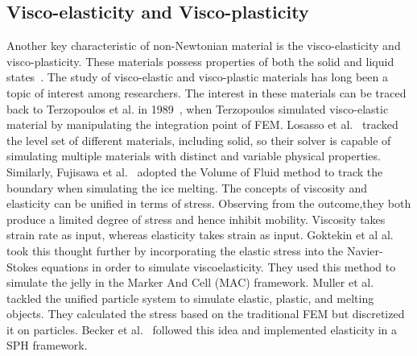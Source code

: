 \documentclass[10pt,journal,compsoc]{IEEEtran}
\begin{document}
\subsection{Visco-elasticity and Visco-plasticity}
Another key characteristic of non-Newtonian material is the visco-elasticity and visco-plasticity. These materials possess properties of both the solid and liquid states~\cite{gao2021simulating}. The study of visco-elastic and visco-plastic materials has long been a topic of interest among researchers. The interest in these materials can be traced back to Terzopoulos et al. in 1989~\cite{Terzopoulos1989}, when Terzopoulos simulated visco-elastic material by manipulating the integration point of FEM. Losasso et al.~\cite{Losasso2006} tracked the level set of different materials, including solid, so their solver is capable of simulating multiple materials with distinct and variable physical properties. Similarly, Fujisawa et al.~\cite{Fujisawa2007} adopted the Volume of Fluid method to track the boundary when simulating the ice melting. The concepts of viscosity and elasticity can be unified in terms of stress. Observing from the outcome,they both produce a limited degree of stress and hence inhibit mobility. Viscosity takes strain rate as input, whereas elasticity takes strain as input. Goktekin et al al.~\cite{Goktekin2004} took this thought further by incorporating the elastic stress into the Navier-Stokes equations in order to simulate viscoelasticity. They used this method to simulate the jelly in the Marker And Cell (MAC) framework. Muller et al.~\cite{Muller2004-elastic-plastic-melting} tackled the unified particle system to simulate elastic, plastic, and melting objects. They calculated the stress based on the traditional FEM but discretized it on particles. Becker et al.~\cite{Becker2009} followed this idea and implemented elasticity in a SPH framework.
\end{document}
